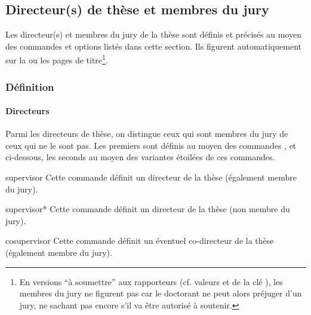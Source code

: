 \subsection{Directeur(s) de thèse et membres du jury}\label{sec-jury}

Les directeur(s) et membres du jury de la thèse sont définis et précisés au
moyen des commandes et options listés dans cette section. Ils figurent
automatiquement sur la ou les pages de titre\footnote{En versions \enquote{à
    soumettre} aux rapporteurs (cf. valeurs \protect{} et
  \protect{} de la clé \protect{}), les
  membres du jury ne figurent pas car le doctorant ne peut alors préjuger d'un
  jury, ne sachant pas encore s'il va être autorisé à soutenir.}.

\subsubsection{Définition}\label{sec-definition-directeurs-jury}

\paragraph{Directeurs}\label{sec-definition-directeurs}

Parmi les directeurs de thèse, on distingue ceux qui sont membres du jury de
ceux qui ne le sont pas. Les premiers sont définis au moyen des commandes
,  et  ci-dessous,
les seconds au moyen des variantes étoilées de ces commandes.

\begin{docCommand}[doc
  description=\mandatory]{supervisor}{}
  Cette commande définit un directeur de la thèse (également membre du jury).
\end{docCommand}

\begin{docCommand}[doc description=\mandatory]{supervisor*}{}
  Cette commande définit un directeur de la thèse (non membre du jury).
\end{docCommand}

\begin{docCommand}{cosupervisor}{}
  Cette commande définit un éventuel co-directeur de la thèse (également membre du jury).
\end{docCommand}

